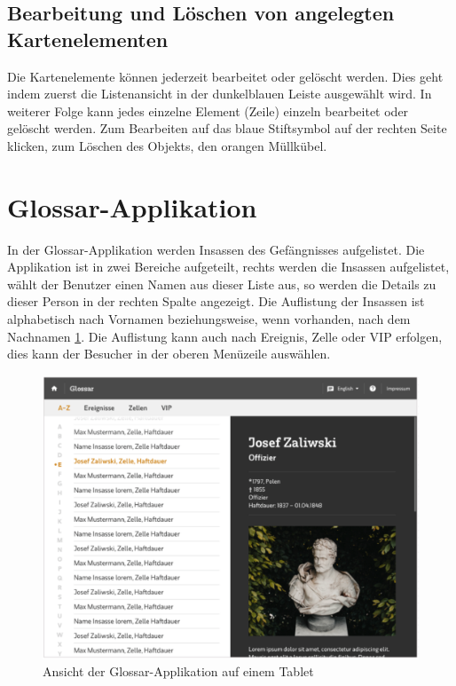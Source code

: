 \subsection{Bearbeitung und Löschen von angelegten Kartenelementen}

Die Kartenelemente können jederzeit bearbeitet oder gelöscht werden. Dies geht indem zuerst die Listenansicht in der dunkelblauen Leiste ausgewählt wird. In weiterer Folge kann jedes einzelne Element (Zeile) einzeln bearbeitet oder gelöscht werden. Zum Bearbeiten auf das blaue Stiftsymbol auf der rechten Seite klicken, zum Löschen des Objekts, den orangen Müllkübel.






\section{Glossar-Applikation}

In der Glossar-Applikation werden Insassen des Gefängnisses aufgelistet. Die Applikation ist in zwei Bereiche aufgeteilt, rechts werden die Insassen aufgelistet, wählt der Benutzer einen Namen aus dieser Liste aus, so werden die Details zu dieser Person in der rechten Spalte angezeigt. Die Auflistung der Insassen ist alphabetisch nach Vornamen beziehungsweise, wenn vorhanden, nach dem Nachnamen \ref{img:glossar}.
Die Auflistung kann auch nach Ereignis, Zelle oder VIP erfolgen, dies kann der Besucher in der oberen Menüzeile auswählen.

\begin{figure}[ht!]
\centering
\includegraphics[width=12cm]{Figures/paula/glossar/glossar_anfang.png}
\caption{Ansicht der Glossar-Applikation auf einem Tablet}
\label{img:glossar}
\end{figure}


